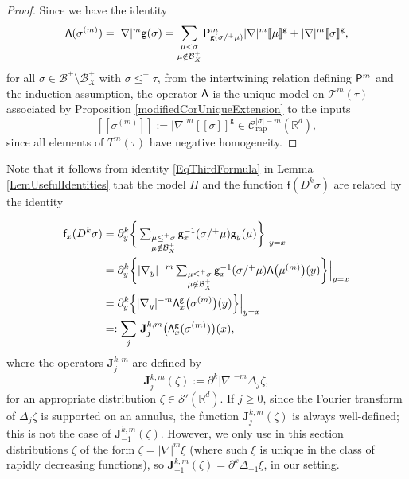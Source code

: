 \documentclass[JEP,XML,SOM,Unicode,published]{cedram}
\theoremstyle{plain}
\theoremstyle{definition}
\newcommand{\Brac}[1]{[\![#1]\!]}
\newcommand{\rap}{\mathrm{rap}}
\newcommand{\bfJ}{\mathbf{J}}
\newcommand{\sfP}{\mathsf{P}}
\newcommand{\sff}{\mathsf{f}}
\newcommand{\sfg}{\mathsf{g}}
\newcommand{\sfPi}{\mathsf{\Pi}}
\newcommand{\scrT}{\mathscr{T}}
\newcommand{\bbR}{\mathbb{R}}
\newcommand{\mcB}{\mathcal{B}}
\newcommand{\mcC}{\mathcal{C}}
\newcommand\mcS{\mathcal{S}}
\begin{document}
\begin{proof}
Since we have the identity
\[
{\sf\Lambda}(\sigma^{(m)}) = |\nabla|^m\sfg(\sigma) = \sum_{\substack{\mu<\sigma\\\mu\notin\mcB_X^+}}\sfP^m_{\sfg(\sigma/^+\mu)}|\nabla|^m \Brac{\mu}^\sfg + |\nabla|^m\Brac{\sigma}^\sfg,
\]
for all $\sigma\in\mcB^+\setminus\mcB_X^+$ with $\sigma\le^+\tau$, from the intertwining relation defining ${\sf P}^m$ and the induction assumption, the operator $\sf\Lambda$ is the unique model on $\scrT^m(\tau)$ associated by Proposition \ref{modifiedCorUniqueExtension} to the inputs
\[
\Brac{\sigma^{(m)}}:=|\nabla|^m\Brac{\sigma}^\sfg\in \mcC_\rap^{|\sigma|-m}(\bbR^d),
\]
since all elements of $T^m(\tau)$ have negative homogeneity.
\end{proof}

Note that it follows from identity \eqref{EqThirdFormula} in Lemma \ref{LemUsefulIdentities} that the model $\sfPi$ and the function $\sff(D^k\sigma)$ are related by the identity

\begin{equation} \label{formula:f_xD^k}
\begin{split}
\sff_x(D^k\sigma) &= \partial_y^k\bigg\{\textstyle\sum_{\substack{\mu\leq^+\sigma\\\mu\notin\mcB_X^+}}\sfg_x^{-1}(\sigma/^+\mu)\sfg_y(\mu)\bigg\}\Big|_{y=x} \\
&= \partial_y^k\bigg\{|\nabla_y|^{-m} \textstyle\sum_{\substack{\mu\leq^+\sigma\\\mu\notin\mcB_X^+}}\sfg_x^{-1}(\sigma/^+\mu) {\sf\Lambda}\bigl(\mu^{(m)}\bigr)(y)\bigg\}\Big|_{y=x} \\
&= \partial_y^k\Bigl\{|\nabla_y|^{-m} {\sf\Lambda}^{\sfg}_x\bigl(\sigma^{(m)}\bigr)(y)\Bigr\}\Big|_{y=x} \\
&=: \sum_j\, \bfJ_j^{k,m}\bigl({\sf\Lambda}^{\sfg}_x(\sigma^{(m)})\bigr)(x),
\end{split}
\end{equation}
where the operators $\bfJ_j^{k,m}$ are defined by
\[
\bfJ_j^{k,m}(\zeta) := \partial^k|\nabla|^{-m}\Delta_j\zeta,
\]
for an appropriate distribution $\zeta\in\mcS'(\bbR^d)$. If $j\ge0$, since the Fourier transform of $\Delta_j\zeta$ is supported on an annulus, the function $\bfJ_j^{k,m}(\zeta)$ is always well-defined; this is not the case of $\bfJ_{-1}^{k,m}(\zeta)$. However, we only use in this section distributions $\zeta$ of the form $\zeta=|\nabla|^m\xi$ (where such $\xi$ is unique in the class of rapidly decreasing functions), so $\bfJ_{-1}^{k,m}(\zeta)=\partial^k\Delta_{-1}\xi$, in our setting.
\end{document}
